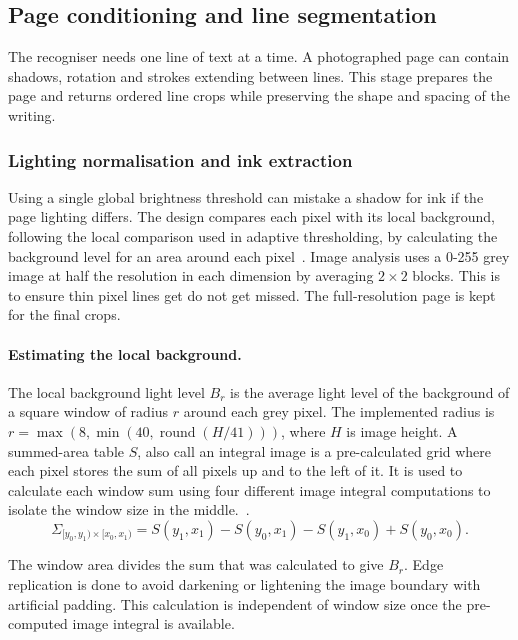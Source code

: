 \subsection{Page conditioning and line segmentation}
\label{sec:des-seg}
The recogniser needs one line of text at a time. A photographed page can contain shadows, rotation and strokes extending between lines. This stage prepares the page and returns ordered line crops while preserving the shape and spacing of the writing.

\subsubsection{Lighting normalisation and ink extraction}
Using a single global brightness threshold can mistake a shadow for ink if the page lighting differs. The design compares each pixel with its local background, following the local comparison used in adaptive thresholding, by calculating the background level for an area around each pixel~\cite[pp.~2--3]{bradley2007}. Image analysis uses a 0-255 grey image at half the resolution in each dimension by averaging $2\times2$ blocks. This is to ensure thin pixel lines get do not get missed. The full-resolution page is kept for the final crops.

\paragraph{Estimating the local background.}
The local background light level $B_r$ is the average light level of the background of a square window of radius $r$ around each grey pixel. The implemented radius is $r=\max(8,\min(40,\operatorname{round}(H/41)))$, where $H$ is image height. A summed-area table $S$, also call an integral image is a pre-calculated grid where each pixel stores the sum of all pixels up and to the left of it. It is used to calculate each window sum using four different image integral computations to isolate the window size in the middle.~\cite[p.~2]{bradley2007}.
\begin{equation}
\Sigma_{[y_0,y_1)\times[x_0,x_1)}=
S(y_1,x_1)-S(y_0,x_1)-S(y_1,x_0)+S(y_0,x_0).
\label{eq:des-integral}
\end{equation}

The window area divides the sum that was calculated to give $B_r$. Edge replication is done to avoid darkening or lightening the image boundary with artificial padding. This calculation is independent of window size once the pre-computed image integral is available.

